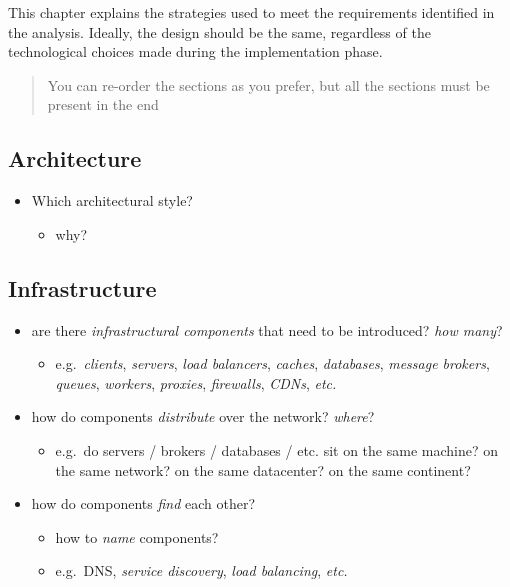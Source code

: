 \documentclass{scrartcl}
\begin{document}
This chapter explains the strategies used to meet the requirements
identified in the analysis. Ideally, the design should be the same,
regardless of the technological choices made during the implementation
phase.

\begin{quote}
You can re-order the sections as you prefer, but all the sections must
be present in the end
\end{quote}

\subsection{Architecture}\label{architecture}

\begin{itemize}
  \item Which architectural style?

  \begin{itemize}
    \item why?
  \end{itemize}
\end{itemize}

\subsection{Infrastructure}\label{infrastructure}

\begin{itemize}
  \item are there \emph{infrastructural components} that need to be
  introduced? \emph{how many}?

  \begin{itemize}
    \item e.g.~\emph{clients}, \emph{servers}, \emph{load balancers},
    \emph{caches}, \emph{databases}, \emph{message brokers},
    \emph{queues}, \emph{workers}, \emph{proxies}, \emph{firewalls},
    \emph{CDNs}, \emph{etc.}
  \end{itemize}
  \item how do components \emph{distribute} over the network? \emph{where}?

  \begin{itemize}
    \item e.g.~do servers / brokers / databases / etc. sit on the same
    machine? on the same network? on the same datacenter? on the same
    continent?
  \end{itemize}
  \item how do components \emph{find} each other?

  \begin{itemize}
    \item how to \emph{name} components?
    \item e.g.~DNS, \emph{service discovery}, \emph{load balancing},
    \emph{etc.}
  \end{itemize}
\end{itemize}
\end{document}
